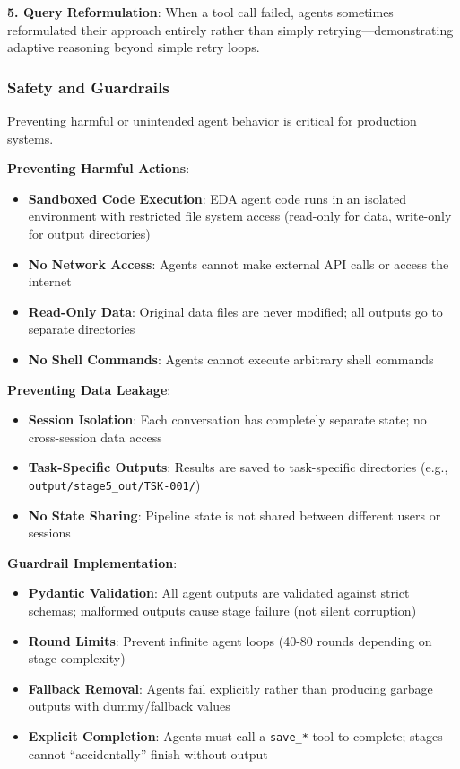 \documentclass[11pt,a4paper]{article}
\begin{document}
\textbf{5. Query Reformulation}:
When a tool call failed, agents sometimes reformulated their approach entirely rather than simply retrying---demonstrating adaptive reasoning beyond simple retry loops.

\subsubsection{Safety and Guardrails}

Preventing harmful or unintended agent behavior is critical for production systems.

\textbf{Preventing Harmful Actions}:
\begin{itemize}
    \item \textbf{Sandboxed Code Execution}: EDA agent code runs in an isolated environment with restricted file system access (read-only for data, write-only for output directories)
    \item \textbf{No Network Access}: Agents cannot make external API calls or access the internet
    \item \textbf{Read-Only Data}: Original data files are never modified; all outputs go to separate directories
    \item \textbf{No Shell Commands}: Agents cannot execute arbitrary shell commands
\end{itemize}

\textbf{Preventing Data Leakage}:
\begin{itemize}
    \item \textbf{Session Isolation}: Each conversation has completely separate state; no cross-session data access
    \item \textbf{Task-Specific Outputs}: Results are saved to task-specific directories (e.g., \texttt{output/stage5\_out/TSK-001/})
    \item \textbf{No State Sharing}: Pipeline state is not shared between different users or sessions
\end{itemize}

\textbf{Guardrail Implementation}:
\begin{itemize}
    \item \textbf{Pydantic Validation}: All agent outputs are validated against strict schemas; malformed outputs cause stage failure (not silent corruption)
    \item \textbf{Round Limits}: Prevent infinite agent loops (40-80 rounds depending on stage complexity)
    \item \textbf{Fallback Removal}: Agents fail explicitly rather than producing garbage outputs with dummy/fallback values
    \item \textbf{Explicit Completion}: Agents must call a \texttt{save\_*} tool to complete; stages cannot ``accidentally'' finish without output
\end{itemize}
\end{document}
